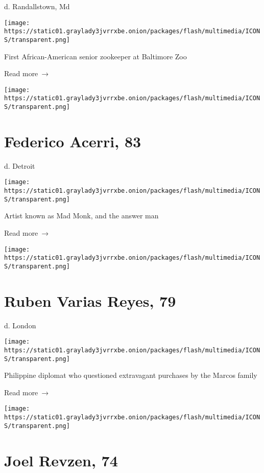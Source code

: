 d. Randallstown, Md

\texttt{[image: https://static01.graylady3jvrrxbe.onion/packages/flash/multimedia/ICONS/transparent.png]}

First African-American senior zookeeper at Baltimore Zoo

 Read more~→

\href{https://www.nytimes3xbfgragh.onion/2020/06/02/us/federico-acerri-dead-coronavirus.html}{}

\texttt{[image: https://static01.graylady3jvrrxbe.onion/packages/flash/multimedia/ICONS/transparent.png]}

\hypertarget{federico-acerri-83}{%
\section{Federico Acerri, 83}\label{federico-acerri-83}}

d. Detroit

\texttt{[image: https://static01.graylady3jvrrxbe.onion/packages/flash/multimedia/ICONS/transparent.png]}

Artist known as Mad Monk, and the answer man

 Read more~→

\href{https://www.nytimes3xbfgragh.onion/2020/06/02/obituaries/ruben-varias-reyes-coronavirus-dead.html}{}

\texttt{[image: https://static01.graylady3jvrrxbe.onion/packages/flash/multimedia/ICONS/transparent.png]}

\hypertarget{ruben-varias-reyes-79}{%
\section{Ruben Varias Reyes, 79}\label{ruben-varias-reyes-79}}

d. London

\texttt{[image: https://static01.graylady3jvrrxbe.onion/packages/flash/multimedia/ICONS/transparent.png]}

Philippine diplomat who questioned extravagant purchases by the Marcos
family

 Read more~→

\href{https://www.nytimes3xbfgragh.onion/2020/06/01/obituaries/joel-revzen-dead-coronavirus.html}{}

\texttt{[image: https://static01.graylady3jvrrxbe.onion/packages/flash/multimedia/ICONS/transparent.png]}

\hypertarget{joel-revzen-74}{%
\section{Joel Revzen, 74}\label{joel-revzen-74}}

